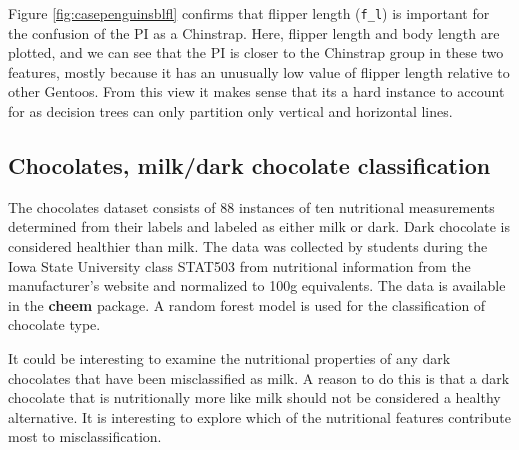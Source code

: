 \documentclass[
]{article}
\begin{document}
Figure \ref{fig:casepenguinsblfl} confirms that flipper length (\texttt{f\_l}) is important for the confusion of the PI as a Chinstrap. Here, flipper length and body length are plotted, and we can see that the PI is closer to the Chinstrap group in these two features, mostly because it has an unusually low value of flipper length relative to other Gentoos. From this view it makes sense that its a hard instance to account for as decision trees can only partition only vertical and horizontal lines.

\hypertarget{chocolates-milkdark-chocolate-classification}{%
\subsection{Chocolates, milk/dark chocolate classification}\label{chocolates-milkdark-chocolate-classification}}

The chocolates dataset consists of 88 instances of ten nutritional measurements determined from their labels and labeled as either milk or dark. Dark chocolate is considered healthier than milk. The data was collected by students during the Iowa State University class STAT503 from nutritional information from the manufacturer's website and normalized to 100g equivalents. The data is available in the \textbf{cheem} package. A random forest model is used for the classification of chocolate type.

It could be interesting to examine the nutritional properties of any dark chocolates that have been misclassified as milk. A reason to do this is that a dark chocolate that is nutritionally more like milk should not be considered a healthy alternative. It is interesting to explore which of the nutritional features contribute most to misclassification.
\end{document}
